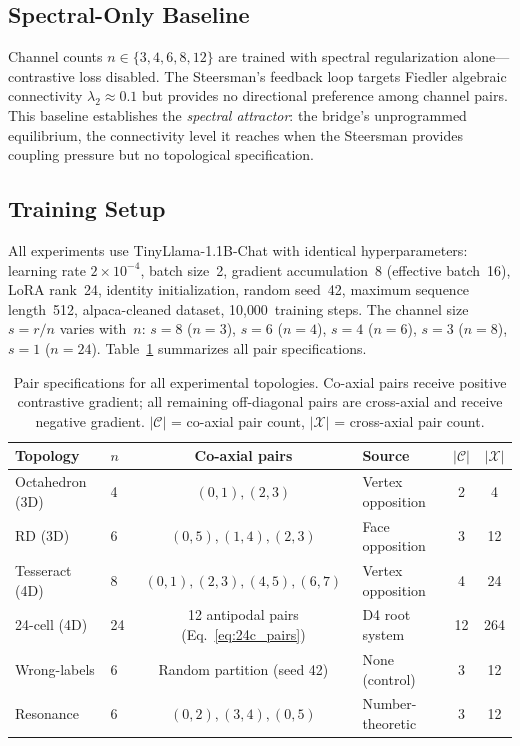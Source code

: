 \subsection{Spectral-Only Baseline}
\label{sec:spectral_baseline}

Channel counts $n \in \{3, 4, 6, 8, 12\}$ are trained with spectral
regularization alone---contrastive loss disabled.  The Steersman's
feedback loop targets Fiedler algebraic connectivity
$\lambda_2 \approx 0.1$ but provides no directional preference
among channel pairs.  This baseline establishes the \emph{spectral
attractor}: the bridge's unprogrammed equilibrium, the connectivity
level it reaches when the Steersman provides coupling pressure but
no topological specification.

\subsection{Training Setup}
\label{sec:training_setup}

All experiments use TinyLlama-1.1B-Chat with identical hyperparameters:
learning rate $2 \times 10^{-4}$, batch size~2, gradient
accumulation~8 (effective batch~16), LoRA rank~24, identity
initialization, random seed~42, maximum sequence length~512,
alpaca-cleaned dataset, 10{,}000~training steps.  The channel size
$s = r/n$ varies with~$n$: $s{=}8$ ($n{=}3$), $s{=}6$ ($n{=}4$),
$s{=}4$ ($n{=}6$), $s{=}3$ ($n{=}8$), $s{=}1$ ($n{=}24$).
Table~\ref{tab:topology_specs} summarizes all pair specifications.

\begin{table}[t]
\centering
\caption{Pair specifications for all experimental topologies.  Co-axial
  pairs receive positive contrastive gradient; all remaining
  off-diagonal pairs are cross-axial and receive negative gradient.
  $|\mathcal{C}|$ = co-axial pair count,
  $|\mathcal{X}|$ = cross-axial pair count.}
\label{tab:topology_specs}
\small
\begin{tabular}{llclcc}
\toprule
Topology & $n$ & Co-axial pairs & Source & $|\mathcal{C}|$ & $|\mathcal{X}|$ \\
\midrule
Octahedron (3D) & 4 & $(0,1), (2,3)$ & Vertex opposition & 2 & 4 \\
RD (3D)         & 6 & $(0,5), (1,4), (2,3)$ & Face opposition & 3 & 12 \\
Tesseract (4D)  & 8 & $(0,1), (2,3), (4,5), (6,7)$ & Vertex opposition & 4 & 24 \\
24-cell (4D)    & 24 & 12 antipodal pairs (Eq.~\ref{eq:24c_pairs}) & D4 root system & 12 & 264 \\
\midrule
Wrong-labels    & 6 & Random partition (seed 42) & None (control)  & 3 & 12 \\
Resonance       & 6 & $(0,2), (3,4), (0,5)$ & Number-theoretic & 3 & 12 \\
\bottomrule
\end{tabular}
\end{table}
